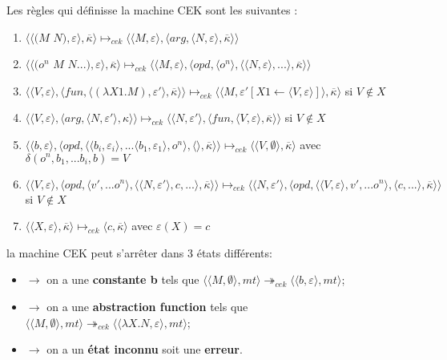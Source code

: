 \documentclass[10pt,a4paper]{article}
\begin{document}
					
					Les règles qui définisse la machine CEK sont les suivantes :
					\begin{enumerate}
						\item $\langle\langle(M$ $N),\varepsilon\rangle,\overline{\kappa}\rangle \longmapsto_{cek} \langle \langle M,\varepsilon\rangle,\langle arg,\langle N,\varepsilon\rangle,\overline{\kappa}\rangle\rangle$
						\item $\langle\langle(o^{n}$ $M$ $N...),\varepsilon\rangle,\overline{\kappa}\rangle \longmapsto_{cek} \langle \langle M,\varepsilon\rangle,\langle opd,\langle o^{n}\rangle,\langle \langle N,\varepsilon\rangle,...\rangle,\overline{\kappa}\rangle\rangle$
						\item $\langle\langle V,\varepsilon\rangle,\langle fun,\langle (\lambda X1.M),\varepsilon'\rangle,\overline{\kappa} \rangle \rangle \longmapsto_{cek} \langle \langle M,\varepsilon'[X1 \leftarrow \langle V,\varepsilon\rangle]\rangle,\overline{\kappa}\rangle$ si $V \notin X$
						\item  $\langle \langle V,\varepsilon\rangle,\langle arg,\langle N,\varepsilon'\rangle,\kappa\rangle\rangle \longmapsto_{cek} \langle \langle N,\varepsilon'\rangle,\langle fun,\langle V,\varepsilon\rangle,\overline{\kappa}\rangle\rangle$ si $V \notin X$
						\item $\langle  \langle b,\varepsilon\rangle,\langle opd,\langle \langle b_{i},\varepsilon_{i}\rangle,...\langle b_{1},\varepsilon_{1}\rangle ,o^{n}\rangle,\langle\rangle,\overline{\kappa}\rangle\rangle \longmapsto_{cek} \langle \langle V,\emptyset\rangle,\overline{\kappa}\rangle$ avec $\delta(o^{n},b_{1},...b_{i},b) = V$
						\item $\langle \langle V,\varepsilon\rangle,\langle opd,\langle v',...o^{n}\rangle,\langle  \langle N,\varepsilon'\rangle,c,...\rangle,\overline{\kappa}\rangle\rangle \longmapsto_{cek} \langle \langle N,\varepsilon'\rangle,\langle opd,\langle  \langle V,\varepsilon\rangle,v',...o^{n}\rangle,\langle c,...\rangle,\overline{\kappa}\rangle\rangle$ si $V \notin X$	
						\item $\langle\langle X,\varepsilon\rangle,\overline{\kappa}\rangle \longmapsto_{cek} \langle c,\overline{\kappa}\rangle$ avec $\varepsilon(X) = c$
						
					\end{enumerate}
					\bigbreak
					
					la machine CEK peut s'arrêter dans 3 états différents:
					\begin{itemize}
						\item[]$\longrightarrow$ on a une \textbf{constante b} tels que $\langle \langle M,\emptyset\rangle,mt\rangle \twoheadrightarrow_{cek} \langle\langle b,\varepsilon\rangle,mt\rangle$;
						\item[]$\longrightarrow$ on a une \textbf{abstraction function} tels que $\langle \langle M,\emptyset\rangle,mt\rangle \twoheadrightarrow_{cek} \langle\langle \lambda X.N,\varepsilon\rangle,mt\rangle$;
						\item[]$\longrightarrow$ on a un \textbf{état inconnu} soit une \textbf{erreur}.
					\end{itemize}
					\bigbreak
				
\end{document}

